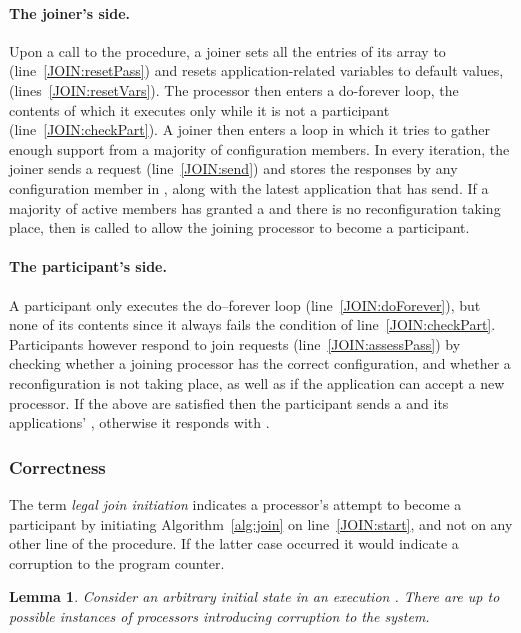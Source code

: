 \documentclass[11pt]{article}
\newtheorem{lemma}[theorem]{Lemma}
\begin{document}
\paragraph{The joiner's side.}
Upon a call to the  procedure, a joiner sets all the entries of its  array to  (line~\ref{JOIN:resetPass}) and resets application-related variables to default values, (lines~\ref{JOIN:resetVars}).
The processor then enters a do-forever loop, the contents of which it executes only while it is not a participant (line~\ref{JOIN:checkPart}).
A joiner then enters a loop in which it tries to gather enough support from a majority of configuration members.
In every iteration, the joiner sends a  request (line~\ref{JOIN:send}) and stores the  responses by any configuration member  in , along with the latest application  that  has send. 
If a majority of active members has granted a  and there is no reconfiguration taking place, then  is called to allow the joining processor to become a participant.


\paragraph{The participant's side.}
A participant only executes the do--forever loop (line~\ref{JOIN:doForever}), but none of its contents since it always fails the condition of line~\ref{JOIN:checkPart}. 
Participants however respond to join requests (line~\ref{JOIN:assessPass}) by checking whether a joining processor has the correct configuration, and whether a reconfiguration is not taking place, as well as if the application can accept a new processor.
If the above are satisfied then the participant sends a  and its applications' , otherwise it responds with . 



\subsubsection{Correctness}
\label{app:join}
The term \emph{legal join initiation} indicates a processor's attempt to become a participant by initiating Algorithm~\ref{alg:join} on line~\ref{JOIN:start}, and not on any other line of the  procedure. If the latter case occurred it would indicate a corruption to the program counter.

\begin{lemma}
\label{thJ:boundedCorruptJoins}
Consider an arbitrary initial state in an execution . 
There are up to  possible instances of processors introducing corruption to the system.
\end{lemma}
\end{document}
